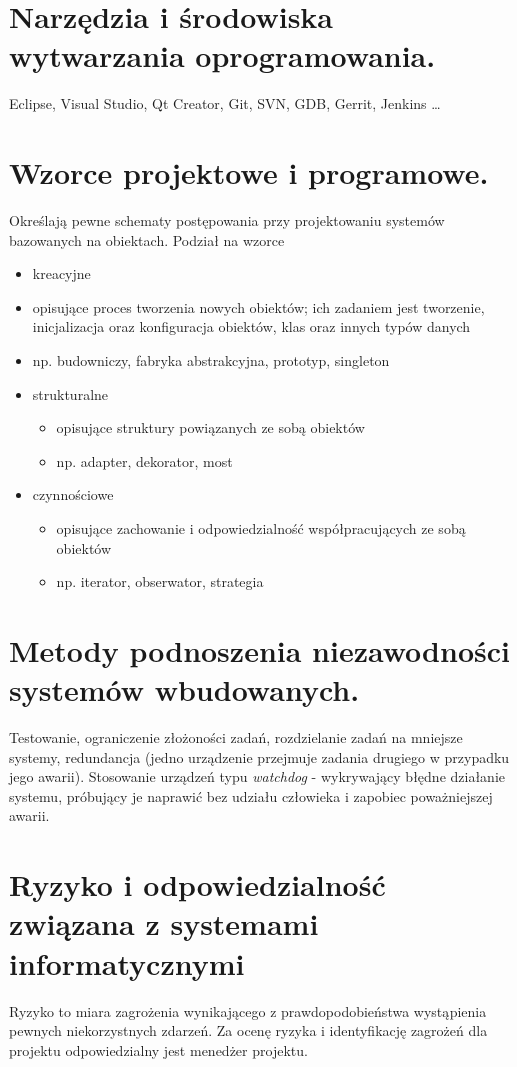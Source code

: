 \documentclass[12pt,a4paper]{article}
\begin{document}
	\section{Narzędzia i środowiska wytwarzania oprogramowania.}
	Eclipse, Visual Studio, Qt Creator, Git, SVN, GDB, Gerrit, Jenkins \dots

	\section{Wzorce projektowe i programowe.}
	Określają pewne schematy postępowania przy projektowaniu systemów bazowanych na obiektach. Podział na wzorce
	\begin{itemize}
		\item kreacyjne
			\item opisujące proces tworzenia nowych obiektów; ich zadaniem jest tworzenie, inicjalizacja oraz konfiguracja obiektów, klas oraz innych typów danych
			\item np. budowniczy, fabryka abstrakcyjna, prototyp, singleton
		\item strukturalne
		\begin{itemize}
			\item opisujące struktury powiązanych ze sobą obiektów
			\item np. adapter, dekorator, most
		\end{itemize}
		\item czynnościowe
		\begin{itemize}
			\item opisujące zachowanie i odpowiedzialność współpracujących ze sobą obiektów
			\item np. iterator, obserwator, strategia
		\end{itemize}
	\end{itemize}

	\section{Metody podnoszenia niezawodności systemów wbudowanych.}
	Testowanie, ograniczenie złożoności zadań, rozdzielanie zadań na mniejsze systemy, redundancja (jedno urządzenie przejmuje zadania drugiego w przypadku jego awarii). Stosowanie urządzeń typu \textit{watchdog} - wykrywający błędne działanie systemu, próbujący je naprawić bez udziału człowieka i zapobiec poważniejszej awarii.

	\section{Ryzyko i odpowiedzialność związana z systemami informatycznymi}
	Ryzyko to miara zagrożenia wynikającego z prawdopodobieństwa wystąpienia pewnych niekorzystnych zdarzeń. Za ocenę ryzyka i identyfikację zagrożeń dla projektu odpowiedzialny jest menedżer projektu.
\end{document}
